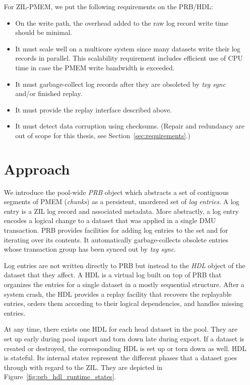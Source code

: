 \documentclass[12pt,a4paper,twoside]{book}
\begin{document}
{For ZIL-PMEM, we put the following requirements on the PRB/HDL:
\begin{itemize}[noitemsep,beginpenalty=100000,midpenalty=100000]
    \item On the write path, the overhead added to the raw log record write time should be minimal.
    \item It must scale well on a multicore system since many datasets write their log records in parallel.
        This scalability requirement includes efficient use of CPU time in case the PMEM write bandwidth is exceeded.
    \item It must garbage-collect log records after they are obsoleted by \textit{txg sync} and/or finished replay.
    \item It must provide the replay interface described above.
    \item It must detect data corruption using checksums. (Repair and redundancy are out of scope for this thesis, see Section~\ref{sec:requirements}.)
\end{itemize}

\section{Approach}\label{di:prb:approach}
We introduce the pool-wide \textit{PRB} object which abstracts a set of contiguous segments of PMEM (\textit{chunks}) as a persistent, unordered set of \textit{log entries}.
A log entry is a ZIL log record and associated metadata.
More abstractly, a log entry encodes a logical change to a dataset that was applied in a single DMU transaction.
PRB provides facilities for adding log entries to the set and for iterating over its contents.
It automatically garbage-collects obsolete entries whose transaction group has been synced out by \textit{txg sync}.

Log entries are not written directly to PRB but instead to the \textit{HDL} object of the dataset that they affect.
A HDL is a virtual log built on top of PRB that organizes the entries for a single dataset in a mostly sequential structure.
After a system crash, the HDL provides a replay facility that recovers the replayable entries, orders them according to their logical dependencies, and handles missing entries.

At any time, there exists one HDL for each head dataset in the pool.
They are set up early during pool import and torn down late during export.
If a dataset is created or destroyed, the corresponding HDL is set up or torn down as well.
HDL is stateful.
Its internal states represent the different phases that a dataset goes through with regard to the ZIL.
They are depicted in Figure~\ref{fig:prb_hdl_runtime_states}.

}
\end{document}
